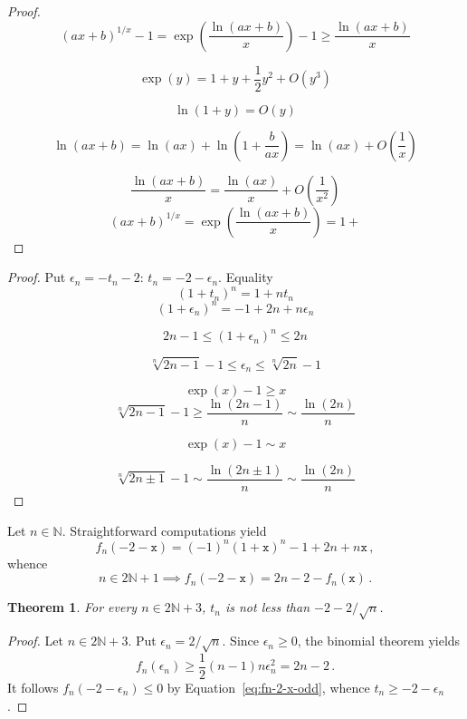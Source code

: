 \documentclass[12pt]{article}
\newcommand{\bN}{\mathbb{N}}
\newcommand{\ttx}{\mathtt{x}}
\newtheorem{theorem}{Theorem}
\begin{document}
\begin{proof}
  
  $$
  {(a x + b)}^{1 / x} - 1 = \exp \left( \frac{\ln (a x + b)}{x} \right) - 1 \ge   \frac{\ln (a x + b)}{x} 
  $$
  
  $$
  \exp(y) = 1 + y + \frac{1}{2} y^2 + O(y^3)  
  $$

  $$
  \ln(1 + y) = O(y) 
  $$

  $$
  \ln(a x + b) = \ln (a x) + \ln \left(1 +  \frac{b}{a x} \right) = \ln(a x) + O \left( \frac{1} {x} \right)
  $$

  $$
   \frac{\ln(ax + b)}{x} = \frac{\ln(a x)}{x} + O \left( \frac{1}{x^2} \right)
  $$
  $$
  {(a x + b)}^{1 / x} = \exp \left( \frac{\ln( a x + b)}{x}  \right) = 1 + 
  $$
\end{proof} 

\begin{proof}
  Put $\epsilon_n = - t_n - 2$: $t_n = - 2 - \epsilon_n$.
  Equality
  $$
  {(1 + t_n)}^n = 1 + n t_n 
  $$
  $$
   {(1 + \epsilon_n)}^n  = - 1 + 2 n + n \epsilon_n 
   $$

   $$
   2 n - 1 \le {(1 + \epsilon_n)}^n  \le  2 n 
   $$

   $$
   \sqrt[n]{2 n - 1} - 1 \le \epsilon_n  \le \sqrt[n]{2 n} - 1
   $$

   $$
   \exp(x) - 1 \ge x
   $$
   $$
   \sqrt[n]{2n - 1} - 1 \ge \frac{\ln(2n - 1)}{n} \sim \frac{\ln(2n)}{n} 
   $$

   $$
   \exp(x) - 1 \sim  x
   $$
   
   $$
   \sqrt[n]{2n \pm 1} - 1 \sim \frac{\ln(2n \pm 1)}{n} \sim \frac{\ln(2n)}{n} 
   $$
   
\end{proof}
Let $n \in \bN$.
Straightforward computations yield
$$
f_n(- 2 - \ttx) = {(- 1)}^n {(1 + \ttx)}^n - 1 + 2n + n \ttx \, , 
$$
whence 
\begin{equation} \label{eq:fn-2-x-odd}
  n \in 2 \bN + 1
  \implies 
 f_n(- 2 - \ttx) = 2n - 2 - f_n(\ttx)   \, .
\end{equation} 
 
\begin{theorem} \label{thm:lower-sqrt}
  For every $n \in 2 \bN + 3$, $t_n$ is not less than $- 2 - 2 / \sqrt{n}$.
\end{theorem}

\begin{proof}
  Let $n \in 2 \bN + 3$.
 Put $\epsilon_n = 2 / \sqrt{n}$.
  Since $\epsilon_n \ge 0$,
  the binomial theorem yields
  $$
  f_n(\epsilon_n ) \ge \frac{1}{2} (n - 1) n \epsilon_n^2 = 2 n - 2 \,.
  $$
  It follows $f_n(- 2 - \epsilon_n) \le 0$ by Equation~\eqref{eq:fn-2-x-odd}, whence $t_n \ge - 2 - \epsilon_n$.
\end{proof} 
\end{document}

